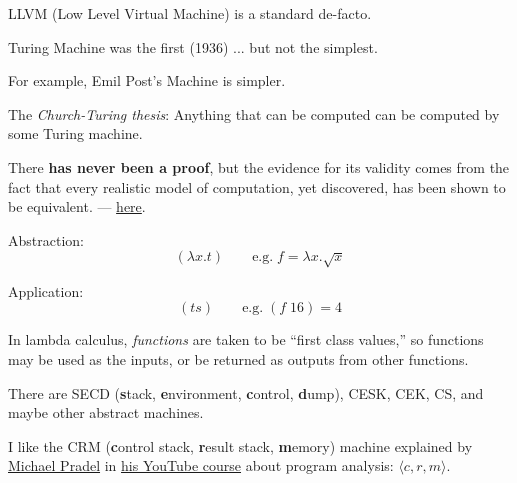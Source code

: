 \documentclass{article}
\begin{document}
LLVM (Low Level Virtual Machine) is a standard de-facto.


\plush{}


Turing Machine was the first (1936) ... but not the simplest.


For example, Emil Post's Machine is simpler.

\plush{}


The \emph{Church-Turing thesis}: Anything that can be computed can be computed by some Turing machine.

There \textbf{has never been a proof}, but the evidence for its validity comes from the fact that every realistic model of computation, yet discovered, has been shown to be equivalent. --- \href{https://mathworld.wolfram.com/Church-TuringThesis.html}{here}.

\plush{}


Abstraction:
\begin{equation*}
(\lambda x . t)\quad\quad \text{e.g.}\; f = \lambda x . \sqrt{x}
\end{equation*}

Application:
\begin{equation*}
(t s)\quad\quad \text{e.g.}\; (f\;16) = 4
\end{equation*}

In lambda calculus, \emph{functions} are taken to be ``first class values,''
so functions may be used as the inputs, or be returned as outputs from other functions.

\plush{}


There are SECD (\textbf{s}tack, \textbf{e}nvironment, \textbf{c}ontrol, \textbf{d}ump),
CESK, CEK, CS, and maybe other abstract machines.

I like the CRM (\textbf{c}ontrol stack, \textbf{r}esult stack, \textbf{m}emory) machine explained by
\href{https://software-lab.org/people/Michael_Pradel.html}{Michael Pradel} in
\href{https://www.youtube.com/watch?v=YRfb2zDk_qs}{his YouTube course} about program analysis:
$\langle c, r, m\rangle$.
\end{document}
